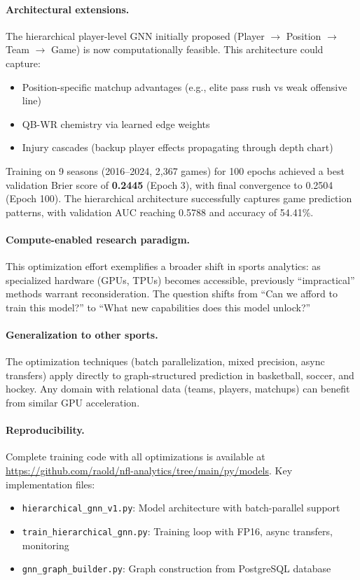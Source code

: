 \paragraph{Architectural extensions.} The hierarchical player-level GNN initially proposed (Player $\to$ Position $\to$ Team $\to$ Game) is now computationally feasible. This architecture could capture:
\begin{itemize}
    \item Position-specific matchup advantages (e.g., elite pass rush vs weak offensive line)
    \item QB-WR chemistry via learned edge weights
    \item Injury cascades (backup player effects propagating through depth chart)
\end{itemize}

Training on 9 seasons (2016--2024, 2,367 games) for 100 epochs achieved a best validation Brier score of \textbf{0.2445} (Epoch 3), with final convergence to 0.2504 (Epoch 100). The hierarchical architecture successfully captures game prediction patterns, with validation AUC reaching 0.5788 and accuracy of 54.41\%.

\paragraph{Compute-enabled research paradigm.} This optimization effort exemplifies a broader shift in sports analytics: as specialized hardware (GPUs, TPUs) becomes accessible, previously ``impractical'' methods warrant reconsideration. The question shifts from ``Can we afford to train this model?'' to ``What new capabilities does this model unlock?''

\paragraph{Generalization to other sports.} The optimization techniques (batch parallelization, mixed precision, async transfers) apply directly to graph-structured prediction in basketball, soccer, and hockey. Any domain with relational data (teams, players, matchups) can benefit from similar GPU acceleration.

\paragraph{Reproducibility.} Complete training code with all optimizations is available at \url{https://github.com/raold/nfl-analytics/tree/main/py/models}. Key implementation files:
\begin{itemize}
    \item \texttt{hierarchical\_gnn\_v1.py}: Model architecture with batch-parallel support
    \item \texttt{train\_hierarchical\_gnn.py}: Training loop with FP16, async transfers, monitoring
    \item \texttt{gnn\_graph\_builder.py}: Graph construction from PostgreSQL database
\end{itemize}

